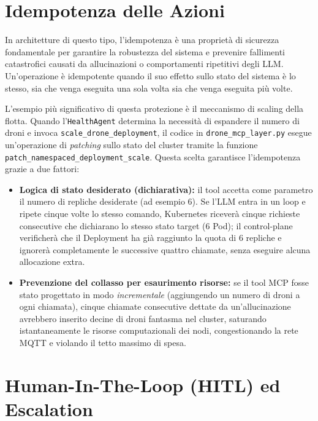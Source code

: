 \section{Idempotenza delle Azioni}
\label{sec:idempotenza_azioni}

In architetture di questo tipo, l'idempotenza è una proprietà di sicurezza fondamentale per garantire la robustezza del sistema e prevenire fallimenti catastrofici causati da allucinazioni o comportamenti ripetitivi degli LLM. Un'operazione è idempotente quando il suo effetto sullo stato del sistema è lo stesso, sia che venga eseguita una sola volta sia che venga eseguita più volte.

L'esempio più significativo di questa protezione è il meccanismo di scaling della flotta. Quando l'\texttt{HealthAgent} determina la necessità di espandere il numero di droni e invoca \texttt{scale\_drone\_deployment}, il codice in \texttt{drone\_mcp\_layer.py} esegue un'operazione di \textit{patching} sullo stato del cluster tramite la funzione \texttt{patch\_namespaced\_deployment\_scale}. Questa scelta garantisce l'idempotenza grazie a due fattori:

\begin{itemize}
    \item \textbf{Logica di stato desiderato (dichiarativa):} il tool accetta come parametro il numero di repliche desiderate (ad esempio 6). Se l'LLM entra in un loop e ripete cinque volte lo stesso comando, Kubernetes riceverà cinque richieste consecutive che dichiarano lo stesso stato target (6 Pod); il control-plane verificherà che il Deployment ha già raggiunto la quota di 6 repliche e ignorerà completamente le successive quattro chiamate, senza eseguire alcuna allocazione extra.
    \item \textbf{Prevenzione del collasso per esaurimento risorse:} se il tool MCP fosse stato progettato in modo \emph{incrementale} (aggiungendo un numero di droni a ogni chiamata), cinque chiamate consecutive dettate da un'allucinazione avrebbero inserito decine di droni fantasma nel cluster, saturando istantaneamente le risorse computazionali dei nodi, congestionando la rete MQTT e violando il tetto massimo di spesa.
\end{itemize}

\section{Human-In-The-Loop (HITL) ed Escalation}
\label{sec:hitl_escalation}

